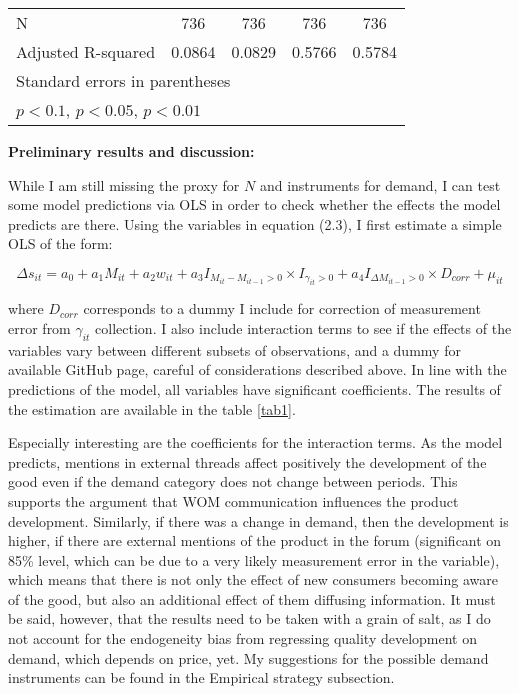 \documentclass[13pt]{article}
\numberwithin{figure}{section}
\numberwithin{table}{section}
\theoremstyle{indented}
\numberwithin{equation}{section} %
\begin{document}
\begin{table}
\begin{tabular}{l*{4}{c}}
\hline
N           &         736         &         736         &         736         &         736         \\
Adjusted R-squared         &            0.0864          &            0.0829         &        0.5766              &          0.5784           \\
\hline\hline
\multicolumn{5}{l}{\footnotesize Standard errors in parentheses}\\
\multicolumn{5}{l}{\footnotesize \sym{*} \(p<0.1\), \sym{**} \(p<0.05\), \sym{***} \(p<0.01\)}\\
\end{tabular}
\end{table}


\textbf{Preliminary results and discussion:}

While I am still missing the proxy for $N$ and instruments for demand, I can test some model predictions via OLS in order to check whether the effects the model predicts are there. Using the variables in equation (2.3), I first estimate a simple OLS of the form:

$$\Delta s_{it} = a_0 + a_1M_{it} + a_2w_{it} + a_3I_{M_{it} -  M_{it-1}>0} \times I_{\gamma_{it}>0} + a_4I_{\Delta M_{it-1}>0}\times D_{corr} + \mu_{it}$$

where $D_{corr}$ corresponds to a dummy I include for correction of measurement error from $\gamma_{it}$ collection. I also include interaction terms to see if the effects of the variables vary between different subsets of observations, and a dummy for available GitHub page, careful of considerations described above. In line with the predictions of the model, all variables have significant coefficients.  The results of the estimation are available in the table \ref{tab1}.

Especially interesting are the coefficients for the interaction terms. As the model predicts, mentions in external threads affect positively the development of the good even if the demand category does not change between periods. This supports the argument that WOM communication influences the product development. Similarly, if there was a change in demand, then the development is higher, if there are external mentions of the product in the forum (significant on 85\% level, which can be due to a very likely measurement error in the variable), which means that there is not only the effect of new consumers becoming aware of the good, but also an additional effect of them diffusing information. It must be said, however, that the results need to be taken with a grain of salt, as I do not account for the endogeneity bias from regressing quality development on demand, which depends on price, yet. My suggestions for the possible demand instruments can be found in the Empirical strategy subsection.
\end{document}

